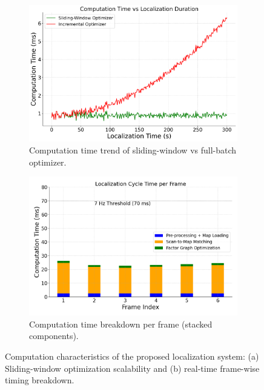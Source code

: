 \begin{figure}[H]
	\centering
	\begin{subfigure}[t]{0.48\textwidth}
		\includegraphics[width=\linewidth]{images/optimizer_runtime_plot.png}
		\caption{Computation time trend of sliding-window vs full-batch optimizer.}
		\label{fig:sliding_vs_batch}
	\end{subfigure}
	\hfill
	\begin{subfigure}[t]{0.48\textwidth}
		\includegraphics[width=\linewidth]{images/localization_cycle_time.png}
		\caption{Computation time breakdown per frame (stacked components).}
		\label{fig:computation_summary1}
	\end{subfigure}
	\caption{Computation characteristics of the proposed localization system: (a) Sliding-window optimization scalability and (b) real-time frame-wise timing breakdown.}
	\label{fig:computation_summary}
\end{figure}


